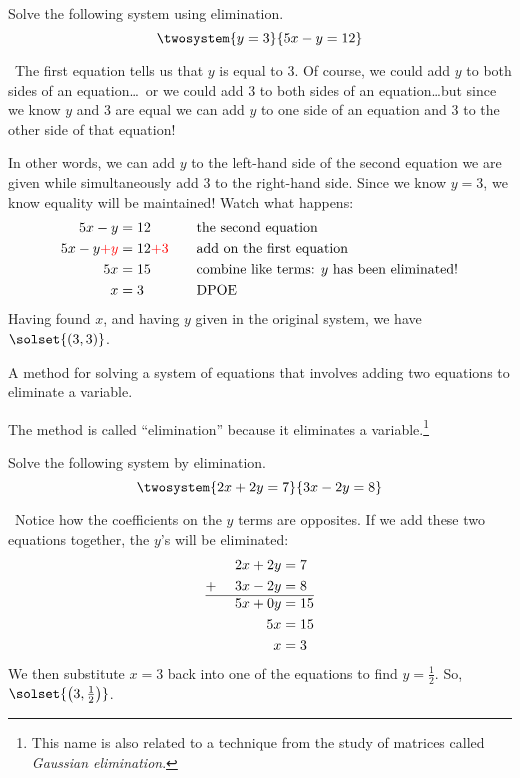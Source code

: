 \begin{boxex}
Solve the following system using elimination. \[\twosystem{y=3}{5x-y=12}\]

\exsoln\ The first equation tells us that $y$ is equal to 3. Of course, we could add $y$ to both sides of an equation\ldots\ or we could add 3 to both sides of an equation\ldots but since we know $y$ and 3 are equal we can add $y$ to one side of an equation and 3 to the other side of that equation!

In other words, we can add $y$ to the left-hand side of the second equation we are given while simultaneously add $3$ to the right-hand side. Since we know $y=3$, we know equality will be maintained! Watch what happens:
\[
\begin{aligned}
5x-y &= 12
&&\quad\text{the second equation}\\
5x-y {\color{red}+y} &=12{\color{red}+3}
&&\quad\text{add on the first equation}\\
5x &=15
&&\quad\text{combine like terms: $y$ has been eliminated!}\\
x &=3
&&\quad\text{DPOE}
\end{aligned}
\]
Having found $x$, and having $y$ given in the original system, we have $\solset{(3,3)}$.
\end{boxex}

\begin{boxdef}
A method for solving a system of equations that involves adding two equations to eliminate a variable.
\end{boxdef}

The method is called ``elimination'' because it eliminates a variable.\footnote{This name is also related to a technique from the study of matrices called \textit{Gaussian elimination}.}

\begin{boxex}
Solve the following system by elimination. \[\twosystem{2x + 2y = 7}{3x - 2y = 8}\]

\exsoln\ Notice how the coefficients on the $y$ terms are opposites. If we add these two equations together, the $y$'s will be eliminated:
\[
\begin{aligned}
		&&2x + 2y	&= 7\\
+~		&&3x - 2y	&= 8\\\hline
		&&5x +0y	&= 15\\
		&&5x 		&= 15\\
		&&x 		&= 3
\end{aligned}
\]
We then substitute $x=3$ back into one of the equations to find $y = \frac{1}{2}$. So, $\solset{\left(3,\frac{1}{2}\right)}$.
\end{boxex}

